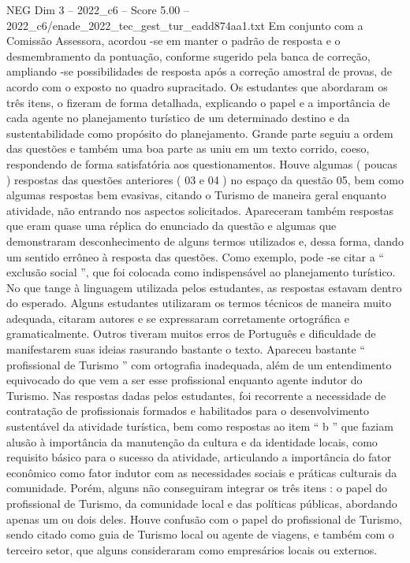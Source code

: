 \begin{textsample}{NEG Dim 3 – 2022\_c6 – Score 5.00 – 2022\_c6/enade\_2022\_tec\_gest\_tur\_eadd874aa1.txt}
Em conjunto com a Comissão Assessora, acordou -se em manter o padrão de resposta e o desmembramento da pontuação, conforme sugerido pela banca de correção, ampliando -se possibilidades de resposta após a correção amostral de provas, de acordo com o exposto no quadro supracitado.
Os estudantes que abordaram os três itens, o fizeram de forma detalhada, explicando o papel e a importância de cada agente no planejamento turístico de um determinado destino e da sustentabilidade como propósito do planejamento.
Grande parte seguiu a ordem das questões e também uma boa parte as uniu em um texto corrido, coeso, respondendo de forma satisfatória aos questionamentos.
Houve algumas ( poucas ) respostas das questões anteriores ( 03 e 04 ) no espaço da questão 05, bem como algumas respostas bem evasivas, citando o Turismo de maneira geral enquanto atividade, não entrando nos aspectos solicitados.
Apareceram também respostas que eram quase uma réplica do enunciado da questão e algumas que demonstraram desconhecimento de alguns termos utilizados e, dessa forma, dando um sentido errôneo à resposta das questões.
Como exemplo, pode -se citar a “ exclusão social ”, que foi colocada como indispensável ao planejamento turístico.
No que tange à linguagem utilizada pelos estudantes, as respostas estavam dentro do esperado.
Alguns estudantes utilizaram os termos técnicos de maneira muito adequada, citaram autores e se expressaram corretamente ortográfica e gramaticalmente.
Outros tiveram muitos erros de Português e dificuldade de manifestarem suas ideias rasurando bastante o texto.
Apareceu bastante “ profissional de Turismo ” com ortografia inadequada, além de um entendimento equivocado do que vem a ser esse profissional enquanto agente indutor do Turismo.
Nas respostas dadas pelos estudantes, foi recorrente a necessidade de contratação de profissionais formados e habilitados para o desenvolvimento sustentável da atividade turística, bem como respostas ao item “ b ” que faziam alusão à importância da manutenção da cultura e da identidade locais, como requisito básico para o sucesso da atividade, articulando a importância do fator econômico como fator indutor com as necessidades sociais e práticas culturais da comunidade.
Porém, alguns não conseguiram integrar os três itens : o papel do profissional de Turismo, da comunidade local e das políticas públicas, abordando apenas um ou dois deles.
Houve confusão com o papel do profissional de Turismo, sendo citado como guia de Turismo local ou agente de viagens, e também com o terceiro setor, que alguns consideraram como empresários locais ou externos.

\end{textsample}
